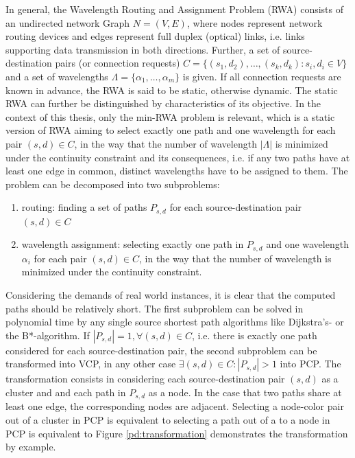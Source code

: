 In general, the Wavelength Routing and Assignment Problem (RWA) consists of an undirected network Graph $N=(V,E)$, where nodes represent network routing devices and edges represent full duplex (optical) links, i.e. links supporting data transmission in both directions. Further, a set of source-destination pairs (or connection requests) $C=\{(s_1,d_2),\ldots , (s_k, d_k) : s_i,d_i \in V\}$ and a set of wavelengths $\Lambda = \{\alpha_1 , \ldots, \alpha_m \}$ is given. If all connection requests are known in advance, the RWA is said to be static, otherwise dynamic. \cite{murthy-02} The static RWA can further be distinguished by characteristics of its objective. In the context of this thesis, only the min-RWA problem is relevant, which is a static version of RWA aiming to select exactly one path and one wavelength for each pair $(s,d) \in C$, in the way that the number of wavelength $\left\vert{\Lambda}\right\vert$ is minimized under the continuity constraint and its consequences, i.e. if any two paths have at least one edge in common, distinct wavelengths have to be assigned to them. The problem can be decomposed into two subproblems:

\begin{enumerate}
\item routing: finding a set of paths $P_{s,d}$ for each source-destination pair $(s,d) \in C$
\item wavelength assignment: selecting exactly one path in $P_{s,d}$ and one wavelength $\alpha_i$ for each pair $(s,d) \in C$, in the way that the number of wavelength is minimized under the continuity constraint.
\end{enumerate}

Considering the demands of real world instances, it is clear that the computed paths should be relatively short. The first subproblem can be solved in polynomial time by any single source shortest path algorithms like Dijkstra's- or the B*-algorithm. If $\left\vert{P_{s,d}}\right\vert = 1, \forall (s,d)\in C$, i.e. there is exactly one path considered for each source-destination pair, the second subproblem can be transformed into VCP, in any other case $\exists (s,d)\in C : \left\vert{P_{s,d}}\right\vert > 1$ into PCP. The transformation consists in considering each source-destination pair $(s,d)$ as a cluster and and each path in $P_{s,d}$ as a node. In the case that two paths share at least one edge, the corresponding nodes are adjacent. Selecting a node-color pair out of a cluster in PCP is equivalent to selecting a path out of a  to a node in PCP is equivalent to Figure \ref{pd:transformation} demonstrates the transformation by example.


